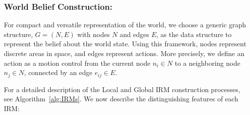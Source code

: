 \documentclass[letterpaper]{article} %
\newcommand{\ph}[1]{{\textbf{#1}:}} %
\begin{document}
\subsubsection{World Belief Construction:} \hfill
\vspace{-0.25pt}

\noindent
For compact and versatile representation of the world, we choose a generic graph structure, $G = (N, E)$ with nodes $N$ and edges $E$, as the data structure to represent the belief about the world state. Using this framework, nodes represent discrete areas in space, and edges represent actions. More precisely, we define an action as a motion control from the current node $n_i \in N$ to a neighboring node $n_j \in N$, connected by an edge $e_{ij} \in E$.


For a detailed description of the Local and Global IRM construction processes, see Algorithm~\ref{alg:IRMs}. We now describe the distinguishing features of each IRM: 
\end{document}
